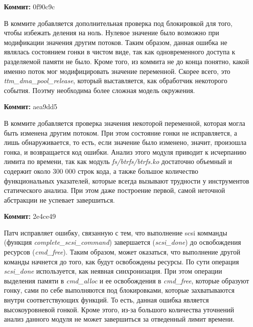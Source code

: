 \vspace{1cm}

\textbf{Коммит:} 0f90c9c

В коммите добавляется дополнительная проверка под блокировкой для того, чтобы избежать деления на ноль.
Нулевое значение было возможно при модификации значения другим потоков.
Таким образом, данная ошибка не являлась состоянием гонки в чистом виде, так как одновременного доступа к разделяемой памяти не было.
Кроме того, из коммита не до конца понятно, какой именно поток мог модифицировать значение переменной.
Скорее всего, это \textit{ttm\_dma\_pool\_release}, который выставляется, как обработчик некоторого события.
Поэтму необходима более сложная модель окружения.

\vspace{1cm}

\textbf{Коммит:} aea9dd5

В коммите добавляется проверка значения некоторой переменной, которая могла быть изменена другим потоком. 
При этом состояние гонки не исправляется, а лишь обнаруживается, то есть, если значение было изменено, значит, произошла гонка, и возвращается код ошибки.
Анализ этого модуля приводит к исчерпанию лимита по времени, так как модуль \textit{fs/btrfs/btrfs.ko} достаточно объемный и содержит около 300 000 строк кода, а также большое количество функциональных указателей, которые всегда вызывают трудности у инструментов статического анализа.
При этом даже построение первой, самой неточной абстракции не успевает завершиться.

\vspace{1cm}

\textbf{Коммит:} 2e4ce49

Патч исправляет ошибку, связанную с тем, что выполнение scsi комманды (функция \textit{complete\_scsi\_command}) завершается (\textit{scsi\_done}) до освобождения ресурсов (\textit{cmd\_free}).
Таким образом, может оказаться, что выполнение другой команды начнется до того, как будут освобождены ресурсы. 
По сути операция \textit{scsi\_done} используется, как неявная синхронизация.
При этом операции выделения памяти в \textit{cmd\_alloc} и ее освобождения в \textit{cmd\_free}, которые образуют гонку, сами по себе выполняются под блокировками, которые захватываются внутри соответствующих функций.
То есть, данная ошибка является высокоуровневой гонкой.
Кроме этого, из-за большого количества уточнений анализ данного модуля не может завершиться за отведенный лимит времени.

\vspace{1cm}

